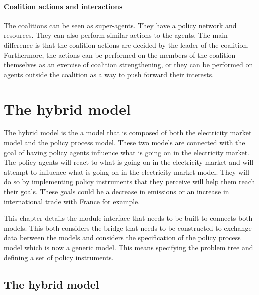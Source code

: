 \paragraph{Coalition actions and interactions}

The coalitions can be seen as super-agents. They have a policy network and resources. They can also perform similar actions to the agents. The main difference is that the coalition actions are decided by the leader of the coalition. Furthermore, the actions can be performed on the members of the coalition themselves as an exercise of coalition strengthening, or they can be performed on agents outside the coalition as a way to push forward their interests.





\section{The hybrid model}
\label{sec:CodeDocHybrid}

The hybrid model is the a model that is composed of both the electricity market model and the policy process model. These two models are connected with the goal of having policy agents influence what is going on in the electricity market. The policy agents will react to what is going on in the electricity market and will attempt to influence what is going on in the electricity market model. They will do so by implementing policy instruments that they perceive will help them reach their goals. These goals could be a decrease in emissions or an increase in international trade with France for example.

This chapter details the module interface that needs to be built to connects both models. This both considers the bridge that needs to be constructed to exchange data between the models and considers the specification of the policy process model which is now a generic model. This means specifying the problem tree and defining a set of policy instruments.

\subsection{The hybrid model}
\label{ssec:hybridModel}

